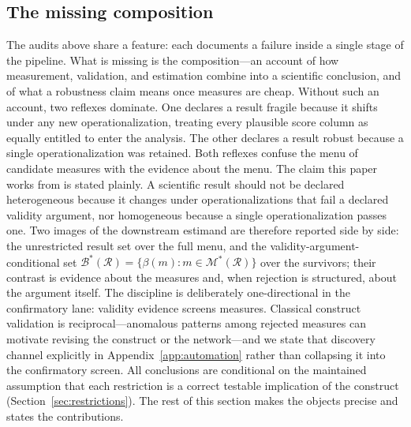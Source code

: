 \documentclass[10pt,letterpaper]{article}
\newcommand{\M}{\ensuremath{\mathcal{M}}}
\newcommand{\Rset}{\mathcal{R}}
\newcommand{\Bset}{\mathcal{B}}
\begin{document}
\subsection{The missing composition}
The audits above share a feature: each documents a failure inside a single stage of the pipeline.
What is missing is the composition---an account of how measurement, validation, and estimation combine into a scientific conclusion, and of what a robustness claim means once measures are cheap.
Without such an account, two reflexes dominate.
One declares a result fragile because it shifts under any new operationalization, treating every plausible score column as equally entitled to enter the analysis.
The other declares a result robust because a single operationalization was retained.
Both reflexes confuse the menu of candidate measures with the evidence about the menu.
The claim this paper works from is stated plainly.
A scientific result should not be declared heterogeneous because it changes under operationalizations that fail a declared validity argument, nor homogeneous because a single operationalization passes one.
Two images of the downstream estimand are therefore reported side by side: the unrestricted result set over the full menu, and the validity-argument-conditional set $\Bset^*(\Rset)=\{\beta(m):m\in\M^*(\Rset)\}$ over the survivors; their contrast is evidence about the measures and, when rejection is structured, about the argument itself.
The discipline is deliberately one-directional in the confirmatory lane: validity evidence screens measures.
Classical construct validation is reciprocal---anomalous patterns among rejected measures can motivate revising the construct or the network---and we state that discovery channel explicitly in Appendix~\ref{app:automation} rather than collapsing it into the confirmatory screen.
All conclusions are conditional on the maintained assumption that each restriction is a correct testable implication of the construct (Section~\ref{sec:restrictions}).
The rest of this section makes the objects precise and states the contributions.
\end{document}
